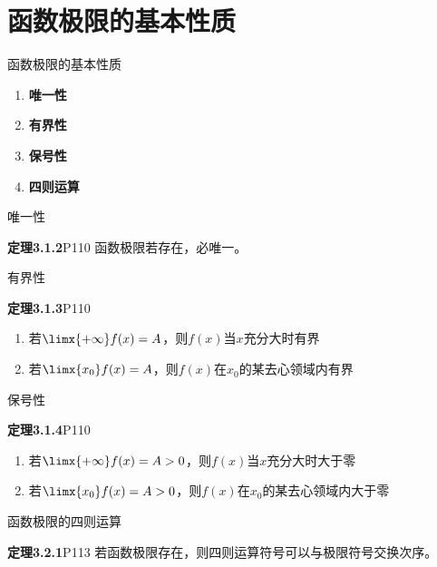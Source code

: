 \section{函数极限的基本性质}

\begin{frame}{函数极限的基本性质}
	\linespread{2}
	\begin{enumerate}\pause 
	  \item {\bf 唯一性}\pause 
	  \item {\bf 有界性}\pause 
	  \item {\bf 保号性}\pause 
	  \item {\bf 四则运算}
	\end{enumerate}
\end{frame}

\begin{frame}{唯一性}
	\linespread{1.5}\pause 
	\begin{block}{{\bf 定理3.1.2}\hfill P110}
		函数极限若存在，必唯一。
	\end{block}
\end{frame}

\begin{frame}{有界性}
	\linespread{1.5}\pause 
	\begin{block}{{\bf 定理3.1.3}\hfill P110}
		\begin{enumerate}
		  \item 若$\limx{+\infty}f(x)=A$，则$f(x)$当$x$充分大时有界\pause 
		  \item 若$\limx{x_0}f(x)=A$，则$f(x)$在$x_0$的某去心领域内有界
		\end{enumerate}
	\end{block}
\end{frame}

\begin{frame}{保号性}
	\linespread{1.5}\pause 
	\begin{block}{{\bf 定理3.1.4}\hfill P110}
		\begin{enumerate}
		  \item 若$\limx{+\infty}f(x)=A>0$，则$f(x)$当$x$充分大时大于零\pause 
		  \item 若$\limx{x_0}f(x)=A>0$，则$f(x)$在$x_0$的某去心领域内大于零
		\end{enumerate}
	\end{block}
\end{frame}

\begin{frame}{函数极限的四则运算}
	\linespread{1.5}\pause 
	\begin{block}{{\bf 定理3.2.1}\hfill P113}
		若函数极限存在，则四则运算符号可以与极限符号交换次序。
	\end{block}
\end{frame}

